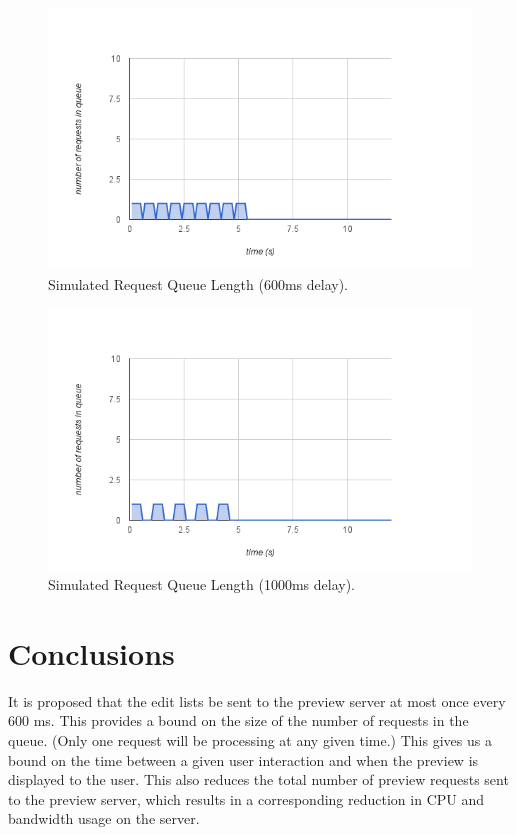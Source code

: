 \documentclass[se,resubmit]{uw-wkrpt}
\begin{document}
\begin{figure}
  \centering
  \includegraphics{sim-600ms}
  \caption{Simulated Request Queue Length (600ms delay).}
  \label{fig:sim-600ms}
\end{figure}

\begin{figure}
  \centering
  \includegraphics{sim-1000ms}
  \caption{Simulated Request Queue Length (1000ms delay).}
  \label{fig:sim-1000ms}
\end{figure}

\section{Conclusions}
It is proposed that the edit lists be sent to the preview server at most once
every 600 ms. This provides a bound on the size of the number of requests in the
queue. (Only one request will be processing at any given time.) This gives us a
bound on the time between a given user interaction and when the preview is
displayed to the user. This also reduces the total number of preview requests
sent to the preview server, which results in a corresponding reduction in CPU
and bandwidth usage on the server.
\end{document}
